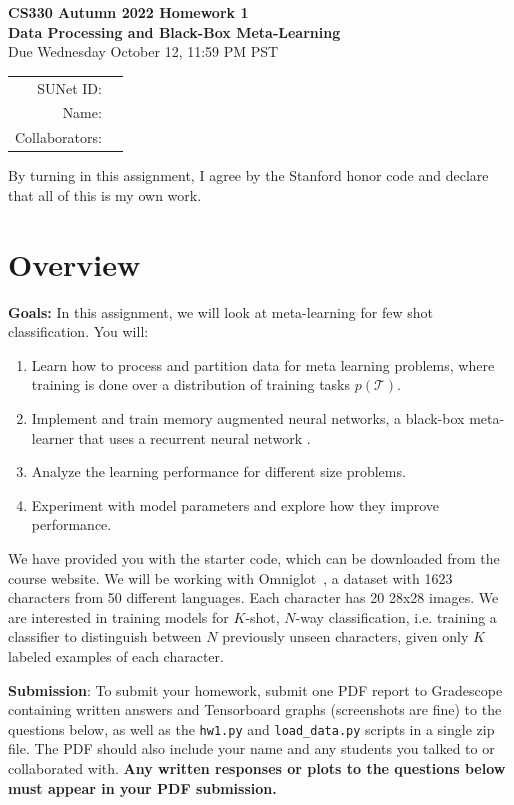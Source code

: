 \documentclass[12pt]{article}
\begin{document}
\begin{center}
{\Large \textbf{CS330 Autumn 2022 Homework 1 \\ Data Processing and Black-Box Meta-Learning}}
\\ {\large Due Wednesday October 12, 11:59 PM PST}

\begin{tabular}{rl}
SUNet ID: &  \\
Name: & \\
Collaborators: & 
\end{tabular}
\end{center}

By turning in this assignment, I agree by the Stanford honor code and declare
that all of this is my own work.

\section*{Overview}

\textbf{Goals:} In this assignment, we will look at meta-learning for few shot classification. You will:
\begin{enumerate}
    \item Learn how to process and partition data for meta learning problems, where training is done over a distribution of training tasks $p(\mathcal{T})$.
    \item Implement and train memory augmented neural networks, a black-box meta-learner that uses a recurrent neural network \cite{pmlr-v48-santoro16}.
    \item Analyze the learning performance for different size problems.
    \item Experiment with model parameters and explore how they improve performance.
\end{enumerate}

We have provided you with the starter code, which can be downloaded from the course website. We will be working with Omniglot~\cite{Lake1332}, a dataset with 1623 characters from 50 different languages. Each character has 20 28x28 images.
We are interested in training models for $K$-shot, $N$-way classification, i.e. training a classifier to distinguish between $N$ previously unseen characters, given only $K$ labeled examples of each character.

\vspace{0.2cm}
\noindent\textbf{Submission}: To submit your homework, submit one PDF report to Gradescope containing written answers and Tensorboard graphs (screenshots are fine) to the questions below, as well as the \texttt{hw1.py} and \texttt{load\_data.py} scripts in a single zip file. The PDF should also include your name and any students you talked to or collaborated with. \textbf{Any written responses or plots to the questions below must appear in your PDF submission.} 
\end{document}
